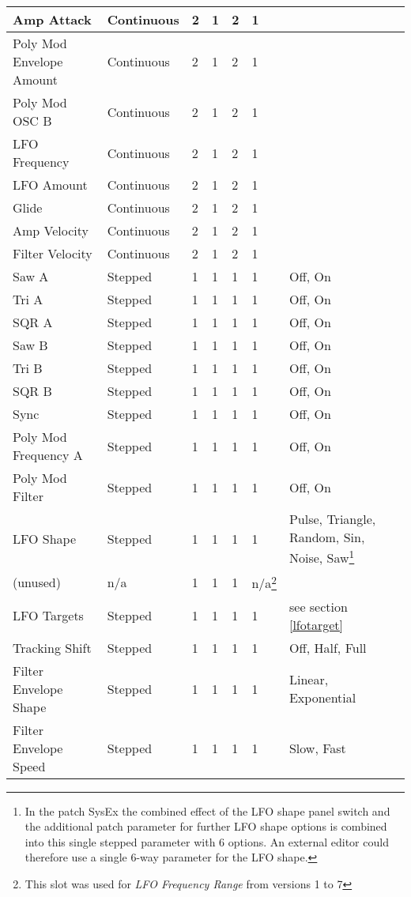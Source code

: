 \begin{longtable}[l]{p{5cm}|p{2cm}|p{1.5cm}|p{1.5cm}|p{2cm}|p{2.2cm}|p{5cm}}
Amp Attack & Continuous & 2 & 1 & 2 & 1 &  \\ \hline
Poly Mod Envelope Amount & Continuous & 2 & 1 & 2 & 1 &  \\ \hline
Poly Mod OSC B & Continuous & 2 & 1 & 2 & 1 &  \\ \hline
LFO Frequency & Continuous & 2 & 1 & 2 & 1 &  \\ \hline
LFO Amount & Continuous & 2 & 1 & 2 & 1 &  \\ \hline
Glide & Continuous & 2 & 1 & 2 & 1 &  \\ \hline
Amp Velocity & Continuous & 2 & 1 & 2 & 1 &  \\ \hline
Filter Velocity & Continuous & 2 & 1 & 2 & 1 &  \\ \hline
Saw A & Stepped & 1 & 1 & 1 & 1 & Off, On \\ \hline
Tri A & Stepped & 1 & 1 & 1 & 1 & Off, On \\ \hline
SQR A & Stepped & 1 & 1 & 1 & 1 & Off, On \\ \hline
Saw B & Stepped & 1 & 1 & 1 & 1 & Off, On \\ \hline
Tri B & Stepped & 1 & 1 & 1 & 1 & Off, On \\ \hline
SQR B & Stepped & 1 & 1 & 1 & 1 & Off, On \\ \hline
Sync & Stepped & 1 & 1 & 1 & 1 & Off, On \\ \hline
Poly Mod Frequency A & Stepped & 1 & 1 & 1 & 1 & Off, On \\ \hline
Poly Mod Filter & Stepped & 1 & 1 & 1 & 1 & Off, On \\ \hline
LFO Shape & Stepped & 1 & 1 & 1 & 1 & Pulse, Triangle, Random, Sin, Noise, Saw\footnote{In the patch SysEx the combined effect of the LFO shape panel switch and the additional patch parameter for further LFO shape options is combined into this single stepped parameter with 6 options. An external editor could therefore use a single 6-way parameter for the LFO shape.} \\ \hline
(unused) & n/a & 1 & 1 & 1 & n/a\footnote{This slot was used for \textit{LFO Frequency Range} from versions 1 to 7} &  \\ \hline
LFO Targets & Stepped & 1 & 1 & 1 & 1 & see section \ref{lfotarget}  \\ \hline
Tracking Shift & Stepped & 1 & 1 & 1 & 1 & Off, Half, Full \\ \hline
Filter Envelope Shape & Stepped & 1 & 1 & 1 & 1 & Linear, Exponential \\ \hline
Filter Envelope Speed & Stepped & 1 & 1 & 1 & 1 & Slow, Fast \\ \hline

\end{longtable}
